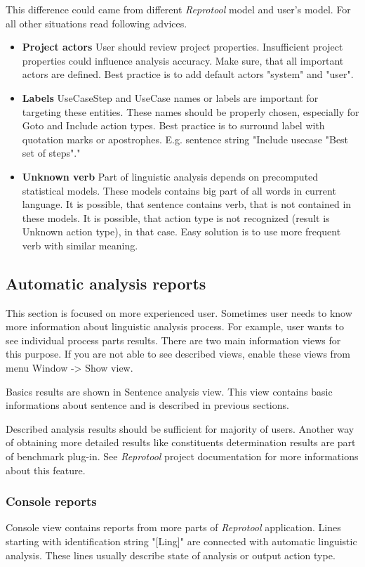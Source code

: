 This difference could came from different \emph{Reprotool} model and user's model. For all other situations read following advices.
\begin{itemize}
\item {\bf Project actors} User should review project properties. Insufficient project properties could influence analysis accuracy. Make sure, that all important actors are defined. Best practice is to add default actors "system" and "user".
 
\item {\bf Labels} UseCaseStep and UseCase names or labels are important for targeting these entities. These names should be properly chosen, especially for Goto and Include action types. Best practice is to surround label with quotation marks or apostrophes. E.g. sentence string "Include usecase "Best set of steps"."

\item {\bf Unknown verb} Part of linguistic analysis depends on precomputed statistical models. These models contains big part of all words in current language. It is possible, that sentence contains verb, that is not contained in these models. It is possible, that action type is not recognized (result is Unknown action type), in that case. Easy solution is to use more frequent verb with similar meaning.

\end{itemize}

\subsection{Automatic analysis reports}
This section is focused on more experienced user. Sometimes user needs to know more information about linguistic analysis process. For example, user wants to see individual process parts results. There are two main information views for this purpose. If you are not able to see described views, enable these views from menu Window -> Show view. 

Basics results are shown in Sentence analysis view. This view contains basic informations about sentence and is described in previous sections.

Described analysis results should be sufficient for majority of users. Another way of obtaining more detailed results like constituents determination results are part of benchmark plug-in. See \emph{Reprotool} project documentation for more informations about this feature.

\subsubsection{Console reports}
Console view contains reports from more parts of \emph{Reprotool} application. Lines starting with identification string "[Ling]" are connected with automatic linguistic analysis. These lines usually describe state of analysis or output action type.

